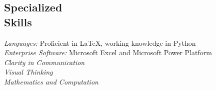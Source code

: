 \documentclass[margin, 10pt]{res} %
\begin{document}
\begin{resume}

\section{\sc Specialized \\ Skills} 

{\sl Languages:} Proficient in \LaTeX, working knowledge in Python\\
{\sl Enterprise Software:} Microsoft Excel and Microsoft Power Platform\\
{\sl Clarity in Communication}\\
{\sl Visual Thinking}\\
{\sl Mathematics and Computation}



\end{resume}
\end{document}
